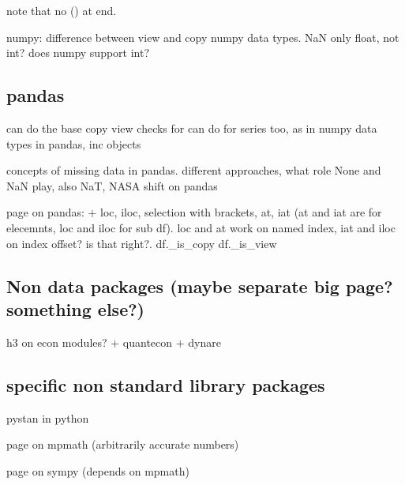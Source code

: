 note that no () at end.

numpy: difference between view and copy
numpy data types. NaN only float, not int? does numpy support int?
\subsection{pandas}
 can do the base copy view checks for can do for series too, as in numpy
data types in pandas, inc objects

concepts of missing data in pandas. different approaches, what role None and NaN play, also NaT, NASA
shift on pandas

page on pandas:
+ loc, iloc, selection with brackets, at, iat (at and iat are for elecemnts, loc and iloc for sub df). loc and at work on named index, iat and iloc on index offset? is that right?.
df.\_is\_copy
df.\_is\_view
\subsection{Non data packages (maybe separate big page? something else?)}
h3 on econ modules?
+ quantecon
+ dynare
\subsection{specific non standard library packages}

pystan in python

page on mpmath (arbitrarily accurate numbers)

page on sympy (depends on mpmath)


